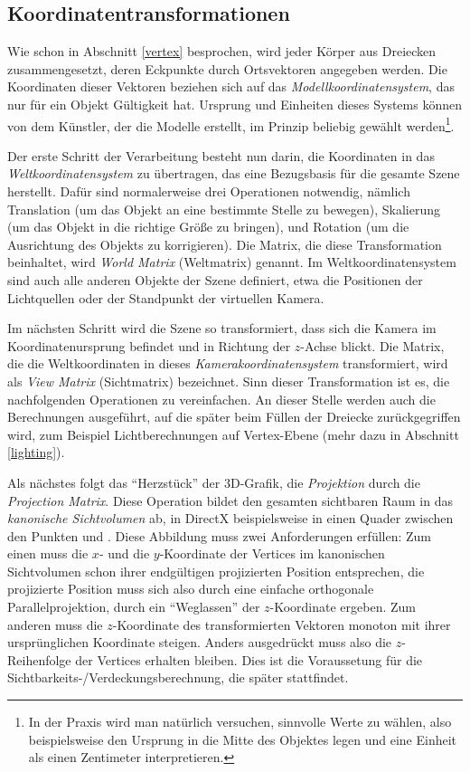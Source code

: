 
\subsection{Koordinatentransformationen}
\label{coordinatesystems}
Wie schon in Abschnitt \ref{vertex} besprochen, wird jeder Körper aus Dreiecken zusammengesetzt, deren Eckpunkte durch Ortsvektoren angegeben werden. Die Koordinaten dieser Vektoren beziehen sich auf das \emph{Modellkoordinatensystem}, das nur für ein Objekt Gültigkeit hat. Ursprung und Einheiten dieses Systems können von dem Künstler, der die Modelle erstellt, im Prinzip beliebig gewählt werden\footnote{In der Praxis wird man natürlich versuchen, sinnvolle Werte zu wählen, also beispielsweise den Ursprung in die Mitte des Objektes legen und eine Einheit als einen Zentimeter interpretieren.}.

Der erste Schritt der Verarbeitung besteht nun darin, die Koordinaten in das \emph{Weltkoordinatensystem} zu übertragen, das eine Bezugsbasis für die gesamte Szene herstellt. Dafür sind normalerweise drei Operationen notwendig, nämlich Translation (um das Objekt an eine bestimmte Stelle zu bewegen), Skalierung (um das Objekt in die richtige Größe zu bringen), und Rotation (um die Ausrichtung des Objekts zu korrigieren). Die Matrix, die diese Transformation beinhaltet, wird \emph{World Matrix} (Weltmatrix) genannt. Im Weltkoordinatensystem sind auch alle anderen Objekte der Szene definiert, etwa die Positionen der Lichtquellen oder der Standpunkt der virtuellen Kamera.

Im nächsten Schritt wird die Szene so transformiert, dass sich die Kamera im Koordinatenursprung befindet und in Richtung der $z$-Achse blickt. Die Matrix, die die Weltkoordinaten in dieses \emph{Kamerakoordinatensystem} transformiert, wird als \emph{View Matrix} (Sichtmatrix) bezeichnet. Sinn dieser Transformation ist es, die nachfolgenden Operationen zu vereinfachen. An dieser Stelle werden auch die Berechnungen ausgeführt, auf die später beim Füllen der Dreiecke zurückgegriffen wird, zum Beispiel Lichtberechnungen auf Vertex-Ebene (mehr dazu in Abschnitt \ref{lighting}).

Als nächstes folgt das \enquote{Herzstück} der 3D-Grafik, die \emph{Projektion} durch die \emph{Projection Matrix}. Diese Operation bildet den gesamten sichtbaren Raum in das \emph{kanonische Sichtvolumen} ab, in DirectX beispielsweise in einen Quader zwischen den Punkten  und . Diese Abbildung muss zwei Anforderungen erfüllen: Zum einen muss die $x$- und die $y$-Koordinate der Vertices im kanonischen Sichtvolumen schon ihrer endgültigen projizierten Position entsprechen, die projizierte Position muss sich also durch eine einfache orthogonale Parallelprojektion, durch ein \enquote{Weglassen} der $z$-Koordinate ergeben. Zum anderen muss die $z$-Koordinate des transformierten Vektoren monoton mit ihrer ursprünglichen Koordinate steigen. Anders ausgedrückt muss also die $z$-Reihenfolge der Vertices erhalten bleiben. Dies ist die Voraussetung für die Sichtbarkeits-/Verdeckungsberechnung, die später stattfindet.

